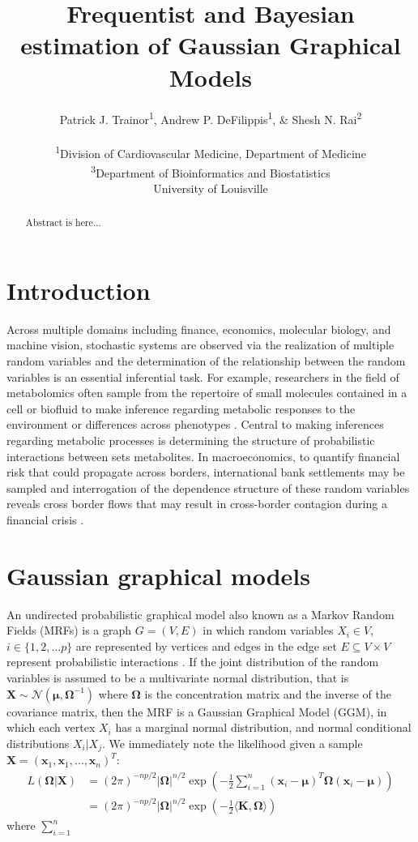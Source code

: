 \documentclass[11pt]{article}
\title{Frequentist and Bayesian estimation of Gaussian Graphical Models}
\author{Patrick J. Trainor\textsuperscript{1}, Andrew P. DeFilippis\textsuperscript{1}, \& Shesh N. Rai\textsuperscript{2} \\ \\
	\textsuperscript{1}Division of Cardiovascular Medicine, Department of Medicine\\
	\textsuperscript{3}Department of Bioinformatics and Biostatistics
\\
University of Louisville}
\date{}
\begin{document}
	
\maketitle

\begin{abstract}
Abstract is here...
\end{abstract}

\section{Introduction}
Across multiple domains including finance, economics, molecular biology, and machine vision, stochastic systems are observed via the realization of multiple random variables and the determination of the relationship between the random variables is an essential inferential task. For example, researchers in the field of metabolomics often sample from the repertoire of small molecules contained in a cell or biofluid to make inference regarding metabolic responses to the environment or differences across phenotypes \cite{johnson2016}. Central to making inferences regarding metabolic processes is determining the structure of probabilistic interactions between sets metabolites. In macroeconomics, to quantify financial risk that could propagate across  borders, international bank settlements may be sampled and interrogation of the dependence structure of these random variables reveals cross border flows that may result in cross-border contagion during a financial crisis \cite{giudici2016}.

\section{Gaussian graphical models}
An undirected probabilistic graphical model also known as a Markov Random Fields (MRFs) is a graph $G=(V,E)$ in which random variables $X_i\in V$, $i\in \{1,2,...p\}$ are represented by vertices and edges in the edge set $E \subseteq V \times V$ represent probabilistic interactions  \citep{koller2009}. If the joint distribution of the random variables  is assumed to be a multivariate normal distribution, that is $\textbf{X}\sim \mathcal{N}(\boldsymbol{\mu},\boldsymbol{\Omega}^{-1})$ where $\boldsymbol{\Omega}$ is the concentration matrix and the inverse of the covariance matrix, then the MRF is a Gaussian Graphical Model (GGM), in which each vertex $X_i$ has a marginal normal distribution, and normal conditional distributions $X_i|X_j$. We immediately note the likelihood given a sample $\textbf{X}=(\textbf{x}_1,\textbf{x}_1,\hdots,\textbf{x}_n)^T$:
\begin{align}
L(\boldsymbol{\Omega}|\textbf{X})&=(2 \pi)^{-np/2}|\boldsymbol{\Omega}|^{n/2} \exp \left(-\frac{1}{2}\sum_{i=1}^{n} (\textbf{x}_i-\boldsymbol{\mu})^T \boldsymbol{\Omega} (\textbf{x}_i-\boldsymbol{\mu})\right) \\
&=(2 \pi)^{-np/2}|\boldsymbol{\Omega}|^{n/2} \exp \left(-\frac{1}{2} \langle \textbf{K}, \boldsymbol{\Omega}\rangle\right)
\end{align}
where $\sum_{i=1}^{n}$
\end{document}
